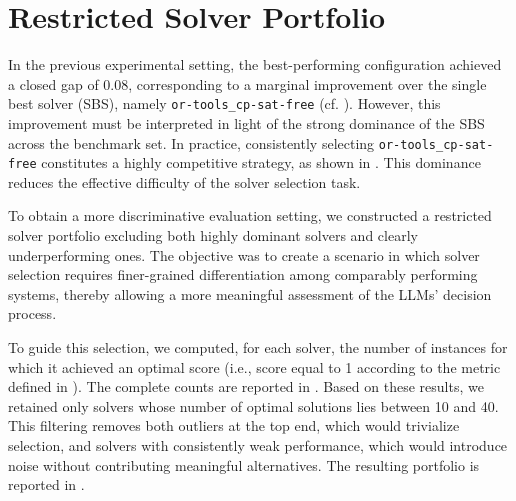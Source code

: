 \documentclass[../../main]{subfiles}
\begin{document}
\section{Restricted Solver Portfolio}
\label{sec:selectedSolvers}

In the previous experimental setting, the best-performing configuration achieved a closed gap of 0.08, corresponding to a marginal improvement over the single best solver (SBS), namely \texttt{or-tools\_cp-sat-free} (cf. ). However, this improvement must be interpreted in light of the strong dominance of the SBS across the benchmark set. In practice, consistently selecting \texttt{or-tools\_cp-sat-free} constitutes a highly competitive strategy, as shown in . This dominance reduces the effective difficulty of the solver selection task.

To obtain a more discriminative evaluation setting, we constructed a restricted solver portfolio excluding both highly dominant solvers and clearly underperforming ones. The objective was to create a scenario in which solver selection requires finer-grained differentiation among comparably performing systems, thereby allowing a more meaningful assessment of the LLMs' decision process.

To guide this selection, we computed, for each solver, the number of instances for which it achieved an optimal score (i.e., score equal to 1 according to the metric defined in ). The complete counts are reported in . Based on these results, we retained only solvers whose number of optimal solutions lies between 10 and 40. This filtering removes both outliers at the top end, which would trivialize selection, and solvers with consistently weak performance, which would introduce noise without contributing meaningful alternatives. The resulting portfolio is reported in .
\end{document}
